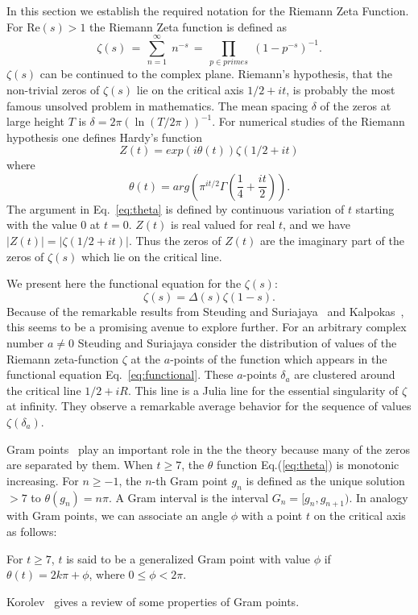 \documentclass[twoside]{article}
\begin{document}
In this section we  establish the required notation for the 
Riemann Zeta Function. 
For $\mathrm{Re} (s) > 1$ the Riemann Zeta function is defined as
\begin{equation}
\zeta ( s ) \, = \, \sum^{\infty}_{n = 1} \; n^{-s} \, = \, \prod_{p \in primes} \;
\left( 1 - p^{-s} \right)^{-1}.
\label{eqRie}
\end{equation}
 $\zeta ( s )$ can be continued to
the complex plane. Riemann's hypothesis, that the non-trivial zeros of $\zeta ( s )$ lie on the 
critical axis $1/2+it$, is probably the most famous unsolved problem in mathematics.
The mean spacing $\delta$ of the zeros  at large height $T$ is $\delta = 2\pi(\ln (T/2\pi))^{-1}$. 
For numerical studies of the Riemann hypothesis one defines Hardy's function
\begin{equation}
Z(t)=exp(i\theta(t))\zeta(1/2 +it) 
\label{eq:hardy}
\end{equation}
where 
\begin{equation}
\theta(t) = arg (\pi^{it/2} \Gamma(\frac{1}{4} + \frac{it}{2})). 
\label{eq:theta}
\end{equation}
The argument in Eq.~\ref{eq:theta} is defined by continuous variation of $t$ starting 
with the value $0$ at $t = 0$.
$Z(t)$ is real valued for real $t$,
and we have $|Z(t)| = |\zeta(1/2+it)|$. Thus the zeros of $Z(t)$ are the imaginary part 
of the zeros 
of $\zeta(s)$ which lie on the critical line.  

We present here the functional equation for the $\zeta(s)$: 
\begin{equation}
\zeta(s) = \Delta(s)\zeta(1-s) . 
\label{eq:functional}
\end{equation}
Because of the remarkable results from Steuding and Suriajaya~\cite{Steuding 2020} 
and Kalpokas~\cite{kalpokas 2009}, this seems to be a promising avenue to explore further.
For an arbitrary complex number $a \ne 0$ Steuding and Suriajaya consider the distribution 
of values of the Riemann zeta-function $\zeta$ at the $a$-points of the 
function
which appears in the functional equation Eq.~\ref{eq:functional}. These $a$-points 
$\delta_a$ are 
clustered around the critical line $1/2 + i R$. This line is a Julia line for the 
essential singularity of $\zeta$ at infinity. 
They observe a remarkable average behavior for the sequence of values $\zeta(\delta_a)$.

Gram points~\cite{Gram 1903} play an important role in the the theory because 
many of the zeros are separated by them.  When $t \ge 7$, 
the $\theta$ function Eq.(\ref{eq:theta}) is monotonic increasing. 
For $n \ge -1$, the $n$-th Gram point $g_n$ is defined as the unique solution $> 7$ to
$\theta (g_n) = n\pi$. A Gram interval is the interval $G_n = [g_n,g_{n+1})$.
 In analogy with Gram points, we can associate an angle $\phi$ with a point $t$ on the critical axis as follows:
\begin{definition}\label{phi}
For $t \ge 7$, $t$ is said to be a generalized Gram point with value $\phi$  if
$\theta (t) = 2k\pi + \phi$, where $0 \le \phi < 2\pi$.
\end{definition}
Korolev~\cite{Korolev 2016a, Korolev 2016b} gives a review of some properties of 
Gram points.
\end{document}

